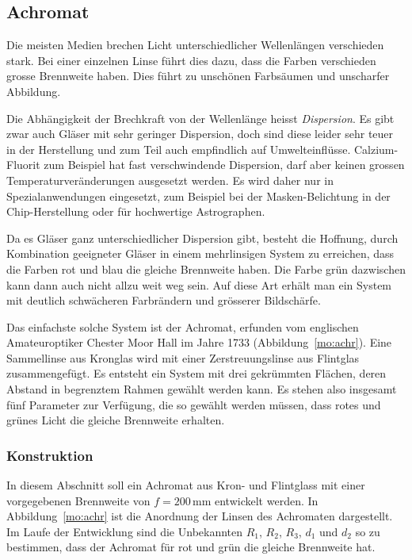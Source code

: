 %
%
%
\subsection{Achromat\label{mo:subsection:achromat}}
Die meisten Medien brechen Licht unterschiedlicher Wellenlängen
verschieden stark.
Bei einer einzelnen Linse führt dies dazu, dass die Farben
verschieden grosse Brennweite haben.
Dies führt zu unschönen Farbsäumen und unscharfer Abbildung.

Die Abhängigkeit der Brechkraft von der Wellenlänge heisst {\em Dispersion}.
Es gibt zwar auch Gläser mit sehr geringer Dispersion, doch sind diese
leider sehr teuer in der Herstellung und zum Teil auch empfindlich
auf Umwelteinflüsse.
Calzium-Fluorit zum Beispiel hat fast verschwindende Dispersion, darf
aber keinen grossen Temperaturveränderungen ausgesetzt werden.
Es wird daher nur in Spezialanwendungen eingesetzt, zum Beispiel bei
der Masken-Belichtung in der Chip-Herstellung oder für hochwertige 
Astrographen.

Da es Gläser ganz unterschiedlicher Dispersion gibt, besteht die Hoffnung,
durch Kombination geeigneter Gläser in einem mehrlinsigen System zu
erreichen, dass die Farben rot und blau die gleiche Brennweite haben.
Die Farbe grün dazwischen kann dann auch nicht allzu weit weg sein.
Auf diese Art erhält man ein System mit deutlich schwächeren Farbrändern
und grösserer Bildschärfe.

Das einfachste solche System ist der Achromat, erfunden vom  englischen
Amateuroptiker Chester Moor Hall im Jahre 1733 (Abbildung~\ref{mo:achr}).
Eine Sammellinse aus Kronglas wird mit einer Zerstreuungslinse aus
Flintglas zusammengefügt.
Es entsteht ein System mit drei gekrümmten Flächen, deren Abstand
in begrenztem Rahmen gewählt werden kann.
Es stehen also insgesamt fünf Parameter zur Verfügung, die so gewählt
werden müssen, dass rotes und grünes Licht die gleiche Brennweite
erhalten.

\subsubsection{Konstruktion}
In diesem Abschnitt soll ein Achromat aus Kron- und Flintglass
mit einer vorgegebenen Brennweite von $f=200\,\text{mm}$ 
entwickelt werden.
In Abbildung~\ref{mo:achr} ist die Anordnung der Linsen des
Achromaten dargestellt.
Im Laufe der Entwicklung sind die Unbekannten $R_1$, $R_2$, $R_3$, $d_1$
und $d_2$ so zu bestimmen, dass der Achromat für rot und grün die
gleiche Brennweite hat.


